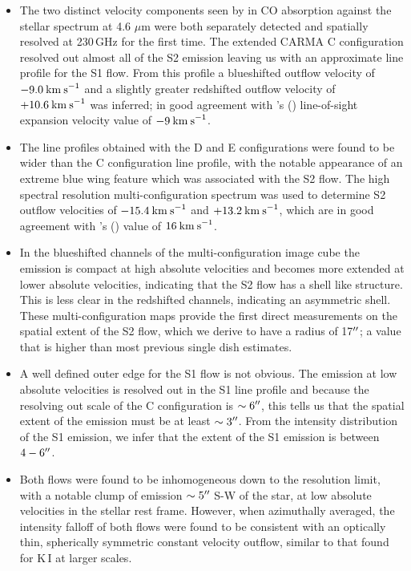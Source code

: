 \begin{itemize}

\item The two distinct velocity components seen by \cite{bernat_1979} in CO absorption against the stellar spectrum at 4.6 $\mu$m were both separately detected and spatially resolved at 230\,GHz for the first time. The extended CARMA C configuration resolved out almost all of the S2 emission leaving us with an approximate line profile for the S1 flow. From this profile a blueshifted outflow velocity of $-9.0\>{\rm km\>s}^{-1}$ and a slightly greater redshifted outflow velocity of $+10.6\>{\rm km\>s}^{-1}$ was inferred; in good agreement with \citeauthor{bernat_1979}'s (\citeyear{bernat_1979}) line-of-sight expansion velocity value of $-9\>{\rm km\>s}^{-1}$.  

\item The line profiles obtained with the D and E configurations were found to be wider than the C configuration line profile, with the notable appearance of an extreme blue wing feature which was associated with the S2 flow. The high spectral resolution multi-configuration spectrum was used to determine S2 outflow velocities of $-15.4\>{\rm km\>s}^{-1}$ and $+13.2\>{\rm km\>s}^{-1}$, which are in good agreement with \citeauthor{bernat_1979}'s (\citeyear{bernat_1979})  value of $16\>{\rm km\>s}^{-1}$.  

\item In the blueshifted channels of the  multi-configuration image cube the emission is compact at high absolute velocities and becomes more extended at lower absolute velocities, indicating that the S2 flow has a shell like structure. This is less clear in the redshifted channels, indicating an asymmetric shell. These multi-configuration maps provide the first direct measurements on the spatial extent of the S2 flow, which we derive to have a radius of 17$^{\prime\prime}$; a value that is higher than most previous single dish estimates. 

\item A well defined outer edge for the S1 flow is not obvious. The emission at low absolute velocities is resolved out in the S1 line profile and because the resolving out scale of the C configuration is $\sim 6^{\prime\prime}$, this tells us that the spatial extent of the emission must be at least $\sim 3^{\prime\prime}$. From the intensity distribution of the S1 emission, we infer that the extent of the S1 emission is between $4-6^{\prime\prime}$.

\item Both flows were found to be inhomogeneous down to the resolution limit, with a notable clump of emission $\sim 5^{\prime\prime}$ S-W of the star, at low absolute velocities in the stellar rest frame. However, when azimuthally averaged, the intensity falloff of both flows were found to be consistent with an optically thin, spherically symmetric constant velocity outflow, similar to that found for K\,I at larger scales.


\end{itemize}
